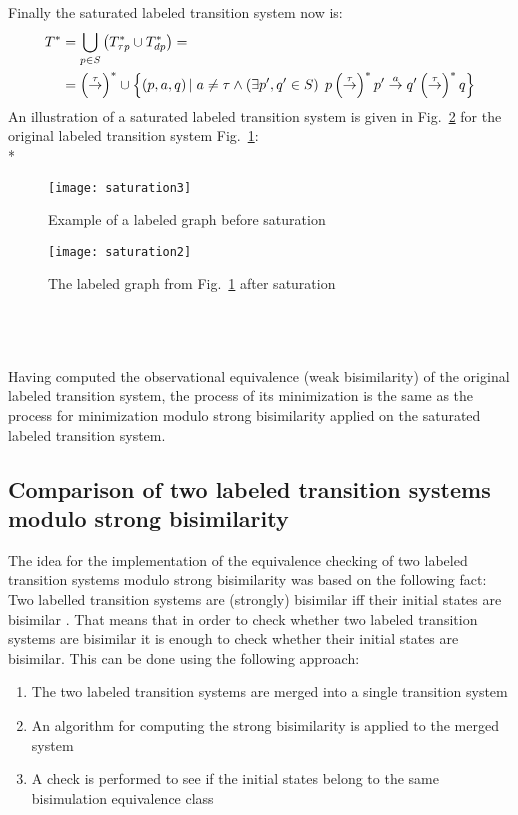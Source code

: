 Finally the saturated labeled transition system now is:
\begin{align*}
	T^{*} &=\bigcup_{p\in \mathit{S}}\left(T^{*}_{\mathit{\tau p}}\cup T^{*}_{dp}\right)=\\
	&=\left(\stackrel{\tau}{\rightarrow}\right)^{*}\cup\left\{\left(p,a,q\right)|\hspace{1mm}a\neq\tau\wedge\left(\exists p',q'\in S\right)\hspace{1mm} p\left(\stackrel{\tau}{\rightarrow}\right)^{*}p'\stackrel{a}{\rightarrow}q'\left(\stackrel{\tau}{\rightarrow}\right)^{*}q\right\}
\end{align*}
An illustration of a saturated labeled transition system is given in Fig.~\ref{fig:saturation2} for the original labeled transition system Fig.~\ref{fig:saturation3}:
\\*
\begin{figure}[h]
\centering
\texttt{[image: saturation3]}
\caption{Example of a labeled graph before saturation}
\label{fig:saturation3}
\end{figure}
\begin{figure}[h]
\centering
\texttt{[image: saturation2]}
\caption{The labeled graph from Fig.~\ref{fig:saturation3} after saturation}
\label{fig:saturation2}
\end{figure}
\\
\\
\\
Having computed the observational equivalence (weak bisimilarity) of the original labeled transition system, the process of its minimization is the same as the process for minimization modulo strong bisimilarity applied on the saturated labeled transition system.

\subsection{Comparison of two labeled transition systems modulo strong bisimilarity}
The idea for the implementation of the equivalence checking of two labeled transition systems modulo strong bisimilarity was based on the following fact: Two labelled transition systems are (strongly) bisimilar iff their initial states are bisimilar \cite{ModellingAndAnalysis}. That means that in order to check whether two labeled transition systems are bisimilar it is enough to check whether their initial states are bisimilar. This can be done using the following approach:
\begin{enumerate}
	\item The two labeled transition systems are merged into a single transition system
	\item An algorithm for computing the strong bisimilarity is applied to the merged system
	\item A check is performed to see if the initial states belong to the same bisimulation equivalence class
\end{enumerate}

